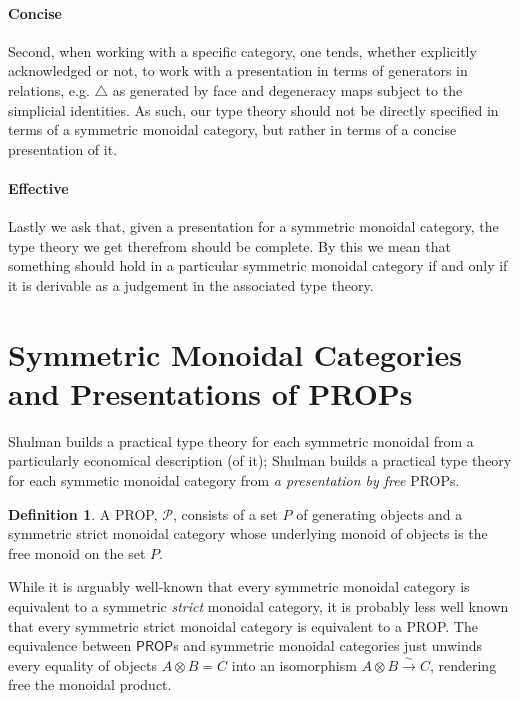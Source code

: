 \documentclass[pra,floatfix,
amsmath,superscriptaddress, 12pt]{article}
\theoremstyle{definition}
\newtheorem{definition}{Definition}
\newcommand{\mc}[1]{\mathcal{#1}}
\begin{document}
\paragraph{Concise} Second, when working with a specific category, one tends, whether explicitly acknowledged or not, to work with a presentation in terms of generators in relations, e.g. $\bigtriangleup$ as generated by face and degeneracy maps subject to the simplicial identities. As such, our type theory should not be directly specified in terms of a symmetric monoidal category, but rather in terms of a concise presentation of it. 

\paragraph{Effective} Lastly we ask that, given a presentation for a symmetric monoidal category, the type theory we get therefrom should be complete. By this we mean that something should hold in a particular symmetric monoidal category if and only if it is derivable as a judgement in the associated type theory.

\section{Symmetric Monoidal Categories and Presentations of \textsf{PROP}s}

Shulman builds a practical type theory for each symmetric monoidal from a particularly economical description (of it); Shulman builds a practical type theory for each symmetic monoidal category from \emph{a presentation by free} \textsf{PROP}s.



\begin{definition} A \textsf{PROP}, $\mc{P}$, consists of a set $P$ of generating objects and a symmetric strict monoidal category whose underlying monoid of objects is the free monoid on the set $P$.
\end{definition}

While it is arguably well-known that every symmetric monoidal category is equivalent
to a symmetric \emph{strict} monoidal category, it is probably less well known
that every symmetric strict monoidal category is equivalent to
a \textsf{PROP}.
%
The equivalence between $\mathsf{PROP}$s and symmetric monoidal categories just unwinds every equality of objects $A\otimes B = C$ into an isomorphism $A \otimes B \overset{\sim}{\longrightarrow} C$, rendering free the monoidal product.
\end{document}
